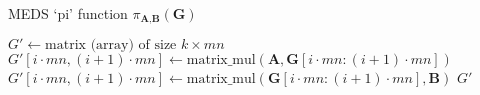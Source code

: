 \begin{algorithm}
  \caption{MEDS `pi' function $\pi_{\textbf{A}, \textbf{B}}(\textbf{G})$}
  \label{alg:medspifunction}
  \begin{algorithmic}
      \State $G' \gets \text{matrix (array) of size } k \times mn$
        \State $G'[i \cdot mn, (i+1) \cdot mn] \gets \text{matrix\_mul}(\textbf{A}, \textbf{G}[i \cdot mn:(i+1) \cdot mn])$
        \State $G'[i \cdot mn, (i+1) \cdot mn] \gets \text{matrix\_mul}(\textbf{G}[i \cdot mn:(i+1) \cdot mn], \textbf{B})$
      \EndFor
      \State \Return $G'$
    \EndFunction
  \end{algorithmic}
\end{algorithm}

